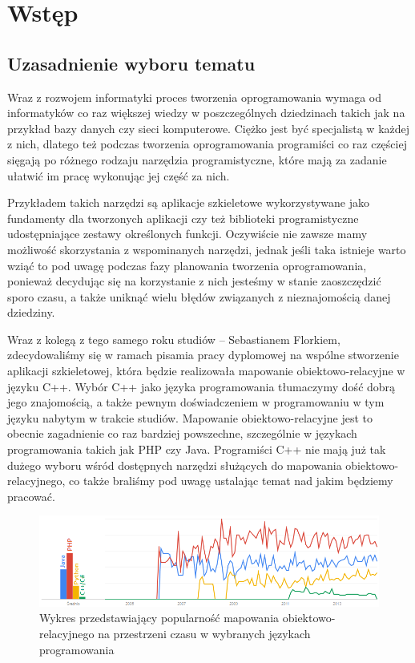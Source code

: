 \documentclass[12pt]{report}
\begin{document}


\tableofcontents

\chapter{Wstęp} \label{wstep}

\section{Uzasadnienie wyboru tematu}

Wraz z rozwojem informatyki proces tworzenia oprogramowania wymaga od informatyków co raz większej wiedzy w poszczególnych dziedzinach takich jak na przykład bazy 
danych czy sieci komputerowe. Ciężko jest być specjalistą w każdej z nich, dlatego też podczas tworzenia oprogramowania programiści co raz częściej sięgają po różnego 
rodzaju narzędzia programistyczne, które mają za zadanie ułatwić im pracę wykonując jej część za nich.

Przykładem takich narzędzi są aplikacje szkieletowe wykorzystywane jako fundamenty dla tworzonych aplikacji czy też biblioteki programistyczne udostępniające zestawy 
określonych funkcji. Oczywiście nie zawsze mamy możliwość skorzystania z wspominanych narzędzi, jednak jeśli taka istnieje warto wziąć to pod uwagę podczas fazy planowania 
tworzenia  oprogramowania, ponieważ decydując się na korzystanie z nich jesteśmy w stanie zaoszczędzić sporo czasu, a także uniknąć wielu błędów związanych z nieznajomością 
danej dziedziny.

Wraz z kolegą z tego samego roku studiów -- Sebastianem Florkiem, zdecydowaliśmy się w ramach pisamia pracy dyplomowej na wspólne stworzenie aplikacji szkieletowej, 
która będzie realizowała mapowanie obiektowo-relacyjne w języku C++. Wybór C++ jako języka programowania tłumaczymy dość dobrą jego znajomością, a także pewnym
doświadczeniem w programowaniu w tym języku nabytym w trakcie studiów. Mapowanie obiektowo-relacyjne jest to obecnie zagadnienie co raz bardziej powszechne, szczególnie w 
językach programowania takich jak PHP czy Java. Programiści C++ nie mają już tak dużego wyboru wśród dostępnych narzędzi służących do mapowania 
obiektowo-relacyjnego, co także braliśmy pod uwagę ustalając temat nad jakim będziemy pracować.

\begin{figure}[H]
\centering
\includegraphics[width=\textwidth]{resources/trends.png}
\caption[Wykres przedstawiający popularność mapowania obiektowo-relacyjnego na przestrzeni czasu w wybranych językach programowania] {Wykres przedstawiający 
popularność mapowania obiektowo-relacyjnego na przestrzeni czasu w wybranych językach programowania \cite{trends}}
\end{figure}
\end{document}
